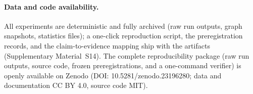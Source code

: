 \documentclass[10pt,a4paper]{article}
\begin{document}
\paragraph{Data and code availability.} All experiments are deterministic and fully archived (raw run outputs, graph snapshots, statistics files); a one-click reproduction script, the preregistration records, and the claim-to-evidence mapping ship with the artifacts (Supplementary Material~S14). The complete reproducibility package (raw run outputs, source code, frozen preregistrations, and a one-command verifier) is openly available on Zenodo (DOI: 10.5281/zenodo.23196280; data and documentation CC BY 4.0, source code MIT).



\end{document}
